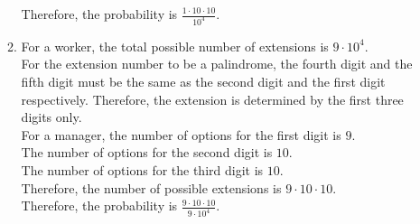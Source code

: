 \documentclass[fleqn, a4paper, 11pt, oneside]{amsart}
\theoremstyle{definition}
\theoremstyle{theorem}
\begin{document}
\begin{solution}
\begin{enumerate}[leftmargin=*]
\begin{enumerate}
					Therefore, the probability is $\frac{1 \cdot 10 \cdot 10}{10^4}$.
				\item
					For a worker, the total possible number of extensions is $9 \cdot 10^4$.\\
					For the extension number to be a palindrome, the fourth digit and the fifth digit must be the same as the second digit and the first digit respectively.
					Therefore, the extension is determined by the first three digits only.\\
					For a manager, the number of options for the first digit is $9$.\\
					The number of options for the second digit is $10$.\\
					The number of options for the third digit is $10$.\\
					Therefore, the number of possible extensions is $9 \cdot 10 \cdot 10$.\\
					Therefore, the probability is $\frac{9 \cdot 10 \cdot 10}{9 \cdot 10^4}$.
			\end{enumerate}
	\end{enumerate}
\end{solution}
\end{document}
